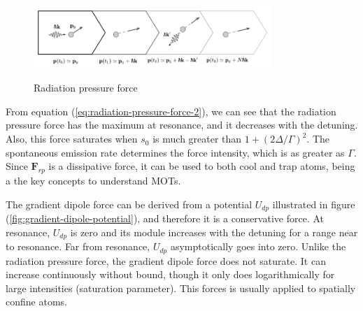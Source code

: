 {\begin{figure}[!ht]
	\centering
	\caption{Radiation pressure force}
	\vspace{-10pt}
	\includegraphics[width=0.8\textwidth]{USPSC-img/radiation_pressure_force.png}
	\vspace{5pt}
	\label{fig:radiation-pressure-force}
	\vspace{-15pt}
\end{figure}

From equation (\ref{eq:radiation-pressure-force-2}), we can see that the radiation pressure force has the maximum at resonance, and it decreases with the detuning. Also, this force saturates when $ s_0 $ is much greater than $ 1 + (2\Delta / \Gamma)^2 $. The spontaneous emission rate determines the force intensity, which is as greater as $ \Gamma $. Since $ \mathbf{F}_{rp} $ is a dissipative force, it can be used to both cool and trap atoms, being a the key concepts to understand MOTs.

The gradient dipole force can be derived from a potential $ U_{dp} $ illustrated in figure (\ref{fig:gradient-dipole-potential}), and therefore it is a conservative force. At resonance, $ U_{dp} $ is zero and its module increases with the detuning for a range near to resonance. Far from resonance, $ U_{dp} $ asymptotically goes into zero. Unlike the radiation pressure force, the gradient dipole force does not saturate. It can increase continuously without bound, though it only does logarithmically for large intensities (saturation parameter). This forces is usually applied to spatially confine atoms.

}
